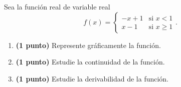 
Sea la función real de variable real
\[
f(x)=\begin{cases}-x+1&\text{si }x<1\\x-1&\text{si }x\geq1\end{cases}.
\]
\begin{enumerate}[label=\alph*)]
\item \textbf{(1 punto)} Represente gráficamente la función.
\item \textbf{(1 punto)} Estudie la continuidad de la función.
\item \textbf{(1 punto)} Estudie la derivabilidad de la función.
\end{enumerate}
